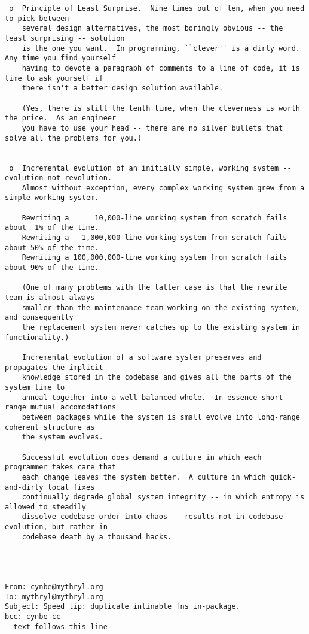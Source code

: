 \begin{verbatim}
 o  Principle of Least Surprise.  Nine times out of ten, when you need to pick between
    several design alternatives, the most boringly obvious -- the least surprising -- solution
    is the one you want.  In programming, ``clever'' is a dirty word.  Any time you find yourself
    having to devote a paragraph of comments to a line of code, it is time to ask yourself if
    there isn't a better design solution available.  

    (Yes, there is still the tenth time, when the cleverness is worth the price.  As an engineer
    you have to use your head -- there are no silver bullets that solve all the problems for you.)


 o  Incremental evolution of an initially simple, working system -- evolution not revolution.
    Almost without exception, every complex working system grew from a simple working system.

    Rewriting a      10,000-line working system from scratch fails about  1% of the time.
    Rewriting a   1,000,000-line working system from scratch fails about 50% of the time.
    Rewriting a 100,000,000-line working system from scratch fails about 90% of the time.

    (One of many problems with the latter case is that the rewrite team is almost always
    smaller than the maintenance team working on the existing system, and consequently
    the replacement system never catches up to the existing system in functionality.)

    Incremental evolution of a software system preserves and propagates the implicit
    knowledge stored in the codebase and gives all the parts of the system time to
    anneal together into a well-balanced whole.  In essence short-range mutual accomodations
    between packages while the system is small evolve into long-range coherent structure as
    the system evolves.

    Successful evolution does demand a culture in which each programmer takes care that
    each change leaves the system better.  A culture in which quick-and-dirty local fixes
    continually degrade global system integrity -- in which entropy is allowed to steadily
    dissolve codebase order into chaos -- results not in codebase evolution, but rather in
    codebase death by a thousand hacks.




From: cynbe@mythryl.org
To: mythryl@mythryl.org
Subject: Speed tip: duplicate inlinable fns in-package.
bcc: cynbe-cc
--text follows this line--


\end{verbatim}
